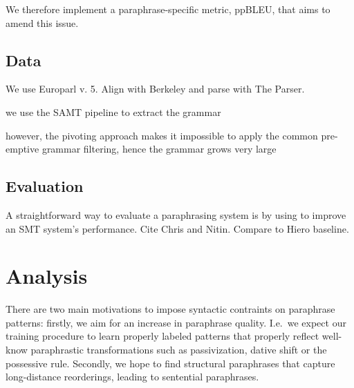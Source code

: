 \documentclass[11pt]{article}
\begin{document}
We therefore implement a paraphrase-specific metric, ppBLEU, that aims
to amend this issue.


\subsection{Data} \label{data}

We use Europarl v. 5. Align with Berkeley and parse with The Parser.

we use the SAMT pipeline to extract the grammar

however, the pivoting approach makes it impossible to apply the common pre-emptive
grammar filtering, hence the grammar grows very large

\subsection{Evaluation} \label{evaluation}

A straightforward way to evaluate a paraphrasing system is by using to
improve an SMT system's performance. Cite Chris and Nitin. Compare to
Hiero baseline.



\section{Analysis} \label{analysis}

There are two main motivations to impose syntactic contraints on
paraphrase patterns: firstly, we aim for an increase in paraphrase
quality. I.e.\ we expect our training procedure to learn properly
labeled patterns that properly reflect well-know paraphrastic
transformations such as passivization, dative shift or the possessive
rule. Secondly, we hope to find structural paraphrases that capture
long-distance reorderings, leading to sentential paraphrases.
\end{document}
